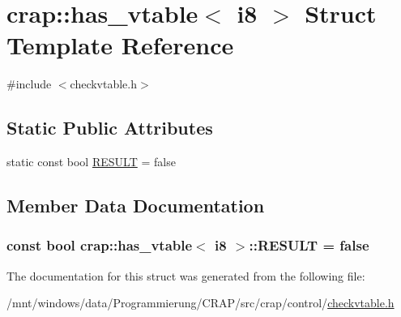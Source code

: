 \hypertarget{structcrap_1_1has__vtable_3_01i8_01_4}{\section{crap\-:\-:has\-\_\-vtable$<$ i8 $>$ Struct Template Reference}
\label{structcrap_1_1has__vtable_3_01i8_01_4}
}


{\ttfamily \#include $<$checkvtable.\-h$>$}

\subsection*{Static Public Attributes}
\begin{DoxyCompactItemize}
\item 
static const bool \hyperlink{structcrap_1_1has__vtable_3_01i8_01_4_a9e5893169f327a34e1cb787663eb7280}{R\-E\-S\-U\-L\-T} = false
\end{DoxyCompactItemize}


\subsection{Member Data Documentation}
\hypertarget{structcrap_1_1has__vtable_3_01i8_01_4_a9e5893169f327a34e1cb787663eb7280}{
\subsubsection[{R\-E\-S\-U\-L\-T}]{\setlength{\rightskip}{0pt plus 5cm}const bool {\bf crap\-::has\-\_\-vtable}$<$ {\bf i8} $>$\-::R\-E\-S\-U\-L\-T = false\hspace{0.3cm}{\ttfamily [static]}}}\label{structcrap_1_1has__vtable_3_01i8_01_4_a9e5893169f327a34e1cb787663eb7280}


The documentation for this struct was generated from the following file\-:\begin{DoxyCompactItemize}
\item 
/mnt/windows/data/\-Programmierung/\-C\-R\-A\-P/src/crap/control/\hyperlink{checkvtable_8h}{checkvtable.\-h}\end{DoxyCompactItemize}
